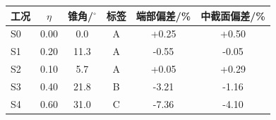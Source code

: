 \begin{tabular}{@{}lS[table-format=1.2]S[table-format=2.1]cS[table-format=+1.2]S[table-format=+1.2]@{}}
\toprule
工况 & {$\eta$} & {锥角/$^\circ$} & 标签 & {端部偏差/\%} & {中截面偏差/\%} \\
\midrule
S0 & 0.00 & 0.0 & A & +0.25 & +0.50 \\
S1 & 0.20 & 11.3 & A & -0.55 & -0.05 \\
S2 & 0.10 & 5.7 & A & +0.05 & +0.29 \\
S3 & 0.40 & 21.8 & B & -3.21 & -1.16 \\
S4 & 0.60 & 31.0 & C & -7.36 & -4.10 \\
\bottomrule
\end{tabular}
